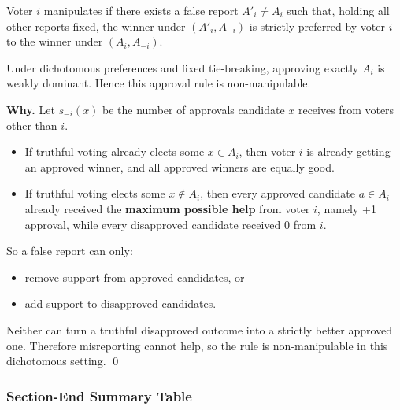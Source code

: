 \begin{defbox}
Voter $i$ manipulates if there exists a false report $A'_i \neq A_i$ such that, holding all other reports fixed, the winner under $(A'_i,A_{-i})$ is strictly preferred by voter $i$ to the winner under $(A_i,A_{-i})$.
\end{defbox}

\begin{thmbox}
Under dichotomous preferences and fixed tie-breaking, approving exactly $A_i$ is weakly dominant. Hence this approval rule is non-manipulable.
\end{thmbox}

\textbf{Why.} Let $s_{-i}(x)$ be the number of approvals candidate $x$ receives from voters other than $i$.
\begin{itemize}
  \item If truthful voting already elects some $x \in A_i$, then voter $i$ is already getting an approved winner, and all approved winners are equally good.
  \item If truthful voting elects some $x \notin A_i$, then every approved candidate $a \in A_i$ already received the \textbf{maximum possible help} from voter $i$, namely +1 approval, while every disapproved candidate received 0 from $i$.
\end{itemize}
So a false report can only:
\begin{itemize}
  \item remove support from approved candidates, or
  \item add support to disapproved candidates.
\end{itemize}
Neither can turn a truthful disapproved outcome into a strictly better approved one. Therefore misreporting cannot help, so the rule is non-manipulable in this dichotomous setting. \qed

\separator

\subsubsection{Section-End Summary Table}

